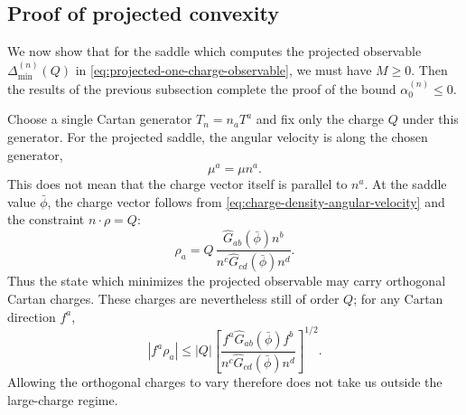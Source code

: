 \documentclass[a4paper,11pt]{article}
\newcommand\Dm{\Delta_{\min}}
\begin{document}
\subsection{Proof of projected convexity}\label{subsec:projected-one-charge-convexity}

We now show that for the saddle which computes the projected observable $\Dm^{(n)}(Q)$ in \eqref{eq:projected-one-charge-observable}, we must have $M\geq0$. Then the results of the previous subsection complete the proof of the bound $\alpha_0^{(n)}\leq 0$. 

Choose a single Cartan generator $T_n=n_aT^a$ and fix only the charge $Q$ under this generator. For the projected saddle, the angular velocity is along the chosen generator,
\begin{equation}\label{eq:projected-angular-velocity}
  \mu^a=\mu n^a .
\end{equation}
This does not mean that the charge vector itself is parallel to $n^a$. At the saddle value $\bar\phi$, the charge vector follows from \eqref{eq:charge-density-angular-velocity} and the constraint $n\cdot\rho=Q$:
\begin{equation}\label{eq:projected-induced-charge-vector}
  \rho_a = Q\, \frac{\widehat G_{ab}(\bar\phi)n^b} {n^c\widehat G_{cd}(\bar\phi)n^d}.
\end{equation}
Thus the state which minimizes the projected observable may carry orthogonal Cartan charges. These charges are nevertheless still of order $Q$; for any Cartan direction $f^a$,
\begin{equation}\label{eq:projected-induced-charge-bound}
  |f^a\rho_a| \leq |Q| \left[ \frac{f^a\widehat G_{ab}(\bar\phi)f^b} {n^c\widehat G_{cd}(\bar\phi)n^d} \right]^{1/2}.
\end{equation}
Allowing the orthogonal charges to vary therefore does not take us outside the large-charge regime.
\end{document}
